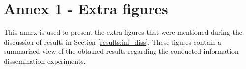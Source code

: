 

\chapter{Annex 1 - Extra figures} \label{annex_1}
\label{ann:lorem_ipsum1}

This annex is used to present the extra figures that were mentioned during the discussion of results in Section \ref{results:inf_diss}. These figures contain a summarized view of the obtained results regarding the conducted information dissemination experiments.

